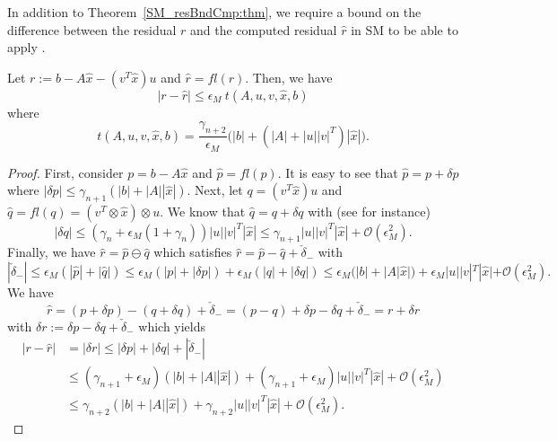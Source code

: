 \documentclass{siamltex}
\newcommand{\eps}{\epsilon}
\begin{document}
In addition to Theorem~\ref{SM_resBndCmp:thm}, we require a bound on the difference between the residual $r$ and the computed residual $\hat r$ in SM to be able to apply \cite[Thm. 12.3]{Higham02}.

\begin{lemma} Let $r := b - A\hat x - (v^T \hat x) u$ and $\hat r = fl(r)$. Then, we have
\begin{equation} \label{rHatBnd:eq}
|r - \hat r| \leq \eps_M \ t(A,u,v,\hat x, b)
\end{equation}
where
\begin{equation} \label{t_rep:eq}
t(A,u,v,\hat x, b) = \frac{\gamma_{n+2}}{\eps_M} \Big(  |b| + (|A|  + |u| |v|^T)|\hat x| \Big).
\end{equation}
\end{lemma}
\begin{proof}
First, consider $p = b - A \hat x$ and $\hat p = fl(p)$. It is easy to see that $\hat p = p + \delta p$ where $|\delta p| \leq \gamma_{n+1} (|b| + |A| |\hat x|)$. Next, let $q = (v^T \hat x) u$ and $\hat q = fl(q) = (v^T \otimes \hat x) \otimes u$. We know that $\hat q = q + \delta q$ with (see \cite[p. 74]{Higham02} for instance)
\[
|\delta q| \leq (\gamma_{n}  + \eps_M (1 + \gamma_n)) |u| |v|^T |\hat x| \leq \gamma_{n+1}  |u| |v|^T |\hat x| + \mathcal{O}(\eps_M^2).
\]
Finally, we have $\hat r = \hat p \ominus \hat q$ which satisfies $\hat r = \hat p - \hat q + \check \delta_{-}$
with 
\[
|\check \delta_{-}| \leq \eps_M (|\hat p| + |\hat q|) \leq \eps_M (|p| + |\delta p|) + \eps_M (|q| + |\delta q|) \leq \eps_M (|b| + |A|\hat x|) + \eps_M  |u| |v|^T |\hat x| + \mathcal{O}(\eps_M^2).
\]
 We have 
\[
\hat r = (p + \delta p) - (q + \delta q) + \check \delta_{-} = (p - q) +  \delta p - \delta q + \check \delta_{-} = r + \delta r
\]
with $\delta r := \delta p - \delta q + \check \delta_{-}$ which yields
\begin{align*}
|r - \hat r| & = |\delta r |  \leq |\delta p| + |\delta q| + |\check \delta_{-}|\\
               & \leq (\gamma_{n+1} + \eps_M) (|b| + |A| |\hat x|) + (\gamma_{n+1} + \eps_M) |u| |v|^T |\hat x| + \mathcal{O}(\eps_M^2) \\
               & \leq \gamma_{n+2} (|b| + |A| |\hat x|) +\gamma_{n+2}  |u| |v|^T |\hat x| + \mathcal{O}(\eps_M^2).
\end{align*}
\end{proof}
\end{document}
